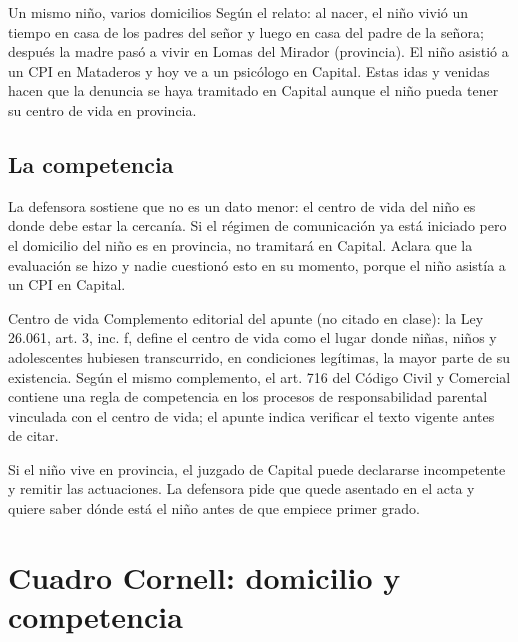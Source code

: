 \documentclass[12pt,oneside]{book}
\begin{document}
\begin{example}{Un mismo ni\~no, varios domicilios}
Seg\'un el relato: al nacer, el ni\~no vivi\'o un tiempo en casa de los padres del se\~nor y luego en casa del padre de la se\~nora; despu\'es la madre pas\'o a vivir en Lomas del Mirador (provincia). El ni\~no asisti\'o a un CPI en Mataderos y hoy ve a un psic\'ologo en Capital. Estas idas y venidas hacen que la denuncia se haya tramitado en Capital aunque el ni\~no pueda tener su centro de vida en provincia.
\end{example}

\subsection{La competencia}

La defensora sostiene que no es un dato menor: el centro de vida del ni\~no es donde debe estar la cercan\'ia. Si el r\'egimen de comunicaci\'on ya est\'a iniciado pero el domicilio del ni\~no es en provincia, no tramitar\'a en Capital. Aclara que la evaluaci\'on se hizo y nadie cuestion\'o esto en su momento, porque el ni\~no asist\'ia a un CPI en Capital.

\begin{definition}{Centro de vida}
Complemento editorial del apunte (no citado en clase): la Ley 26.061, art. 3, inc. f, define el centro de vida como el lugar donde ni\~nas, ni\~nos y adolescentes hubiesen transcurrido, en condiciones leg\'itimas, la mayor parte de su existencia. Seg\'un el mismo complemento, el art. 716 del C\'odigo Civil y Comercial contiene una regla de competencia en los procesos de responsabilidad parental vinculada con el centro de vida; el apunte indica verificar el texto vigente antes de citar.
\end{definition}

\begin{important}
Si el ni\~no vive en provincia, el juzgado de Capital puede declararse incompetente y remitir las actuaciones. La defensora pide que quede asentado en el acta y quiere saber d\'onde est\'a el ni\~no antes de que empiece primer grado.
\end{important}

\section{Cuadro Cornell: domicilio y competencia}
\end{document}
